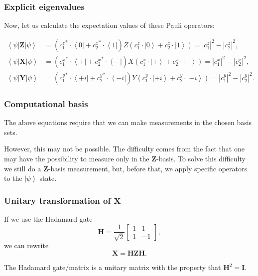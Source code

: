 \documentclass{beamer}
\begin{document}
\begin{frame}
\frametitle{Explicit eigenvalues}

Now, let us calculate the expectation values of these Pauli operators: 

\begin{align*}
\left\langle \psi \right| \bm{Z} \left| \psi \right\rangle &= \left( {c_1^z}^* \cdot \left\langle 0 \right| + {c_2^z}^* \cdot \left\langle 1 \right| \right) Z \left( c_1^z \cdot \left| 0 \right\rangle + c_2^z \cdot \left| 1 \right\rangle \right) = {\left| c_1^z \right|}^2 - {\left| c_2^z \right|}^2,
\\
\left\langle \psi \right| \bm{X} \left| \psi \right\rangle &= \left( {c_1^x}^* \cdot \left\langle + \right| + {c_2^x}^* \cdot \left\langle - \right| \right) X \left( c_1^x \cdot \left| + \right\rangle + c_2^x \cdot \left| - \right\rangle \right) = {\left| c_1^x \right|}^2 - {\left| c_2^x \right|}^2,
\\
\left\langle \psi \right| \bm{Y} \left| \psi \right\rangle &= \left( {c_1^y}^* \cdot \left\langle +i \right| + {c_2^y}^* \cdot \left\langle -i \right| \right) Y \left( c_1^y \cdot \left| +i \right\rangle + c_2^y \cdot \left| -i \right\rangle \right) = {\left| c_1^y \right|}^2 - {\left| c_2^y \right|}^2.
\end{align*}
\end{frame}

\begin{frame}
\frametitle{Computational basis}

The above equations require that we can make measurements in the chosen basis sets.

However, this may not be possible. The difficulty comes  from the fact that one may have the possibility
to measure only in the $\bm{Z}$-basis. To solve this difficulty we still do
a $\bm{Z}$-basis measurement, but, before that, we apply specific operators
to the $\left| \psi \right\rangle$ state.
\end{frame}

\begin{frame}
\frametitle{Unitary transformation of $\bm{X}$}

If we use the Hadamard gate
\[
\bm{H} = \frac{1}{\sqrt{2}}\begin{bmatrix}
1 & 1\\
1 & -1
\end{bmatrix},
\]
we can rewrite
\[
\bm{X}=\bm{HZH}.
\]

The Hadamard gate/matrix is a unitary matrix with the property that $\bm{H}^2=\bm{I}$.
\end{frame}
\end{document}
